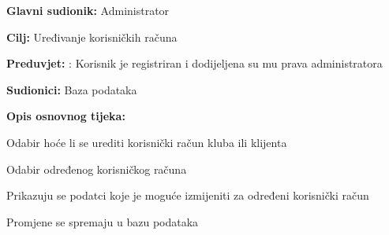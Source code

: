 					\noindent {}
					\begin{packed_item}
	
						\item \textbf{Glavni sudionik: }Administrator
						\item  \textbf{Cilj:} Uređivanje korisničkih računa
						\item  \textbf{Preduvjet:} : Korisnik je registriran i dodijeljena su mu prava administratora
						\item  \textbf{Sudionici:} Baza podataka
						\item  \textbf{Opis osnovnog tijeka:						
						}
						
						\item[] \begin{packed_enum}
	
							\item Odabir hoće li se urediti korisnički račun kluba ili klijenta 
							\item Odabir određenog korisničkog računa
							\item Prikazuju se podatci koje je moguće izmijeniti za određeni korisnički račun
 							\item Promjene se spremaju u bazu podataka
							
						\end{packed_enum}	
						
					\end{packed_item}					
					
